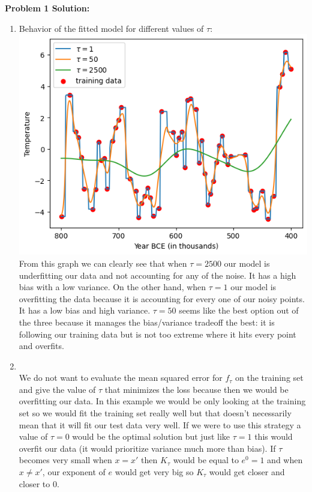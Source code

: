 \documentclass[submit]{harvardml}
\begin{document}
\textbf{Problem 1 Solution:}\\
\begin{enumerate}
    \item 
    Behavior of the fitted model for different values of $\tau$:\\
    \includegraphics[scale=0.8
    ]{hw1/KernelGraph.png}\\
    From this graph we can clearly see that when $\tau=2500$ our model is underfitting our data and not accounting for any of the noise. It has a high bias with a low variance. On the other hand, when $\tau=1$ our model is overfitting the data because it is accounting for every one of our noisy points. It has a low bias and high variance. $\tau=50$ seems like the best option out of the three because it manages the bias/variance tradeoff the best: it is following our training data but is not too extreme where it hits every point and overfits.\\ 
    \item\\
    We do not want to evaluate the mean squared error for $f_{\tau}$  on the training set and give the value of $\tau$ that minimizes the loss because then we would be overfitting our data. In this example we would be only looking at the training set so we would fit the training set really well but that doesn't necessarily mean that it will fit our test data very well. If we were to use this strategy a value of $\tau=0$ would be the optimal solution but just like $\tau=1$ this would overfit our data (it would prioritize variance much more than bias). If $\tau$ becomes very small when $x=x'$ then $K_{\tau}$ would be equal to $e^0=1$ and when $x\neq x'$, our exponent of $e$ would get very big so $K_{\tau}$ would get closer and closer to 0.\\

\end{enumerate}
\end{document}
